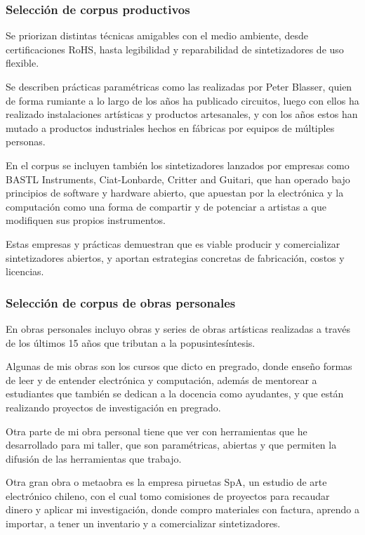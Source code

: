 \documentclass[../candidatura.tex]{subfiles}
\begin{document}
\subsubsection{Selección de corpus productivos}

Se priorizan distintas técnicas amigables con el medio ambiente, desde certificaciones RoHS, hasta legibilidad y reparabilidad de sintetizadores de uso flexible.

Se describen prácticas paramétricas como las realizadas por Peter Blasser, quien de forma rumiante a lo largo de los años ha publicado circuitos, luego con ellos ha realizado instalaciones artísticas y productos artesanales, y con los años estos han mutado a productos industriales hechos en fábricas por equipos de múltiples personas.

En el corpus se incluyen también los sintetizadores lanzados por empresas como BASTL Instruments, Ciat-Lonbarde, Critter and Guitari, que han operado bajo principios de software y hardware abierto, que apuestan por la electrónica y la computación como una forma de compartir y de potenciar a artistas a que modifiquen sus propios instrumentos.

Estas empresas y prácticas demuestran que es viable producir y comercializar sintetizadores abiertos, y aportan estrategias concretas de fabricación, costos y licencias.

\subsubsection{Selección de corpus de obras personales}

En obras personales incluyo obras y series de obras artísticas realizadas a través de los últimos 15 años que tributan a la popusintesíntesis.

Algunas de mis obras son los cursos que dicto en pregrado, donde enseño formas de leer y de entender electrónica y computación, además de mentorear a estudiantes que también se dedican a la docencia como ayudantes, y que están realizando proyectos de investigación en pregrado.

Otra parte de mi obra personal tiene que ver con herramientas que he desarrollado para mi taller, que son paramétricas, abiertas y que permiten la difusión de las herramientas que trabajo.

Otra gran obra o metaobra es la empresa piruetas SpA, un estudio de arte electrónico chileno, con el cual tomo comisiones de proyectos para recaudar dinero y aplicar mi investigación, donde compro materiales con factura, aprendo a importar, a tener un inventario y a comercializar sintetizadores.
\end{document}
